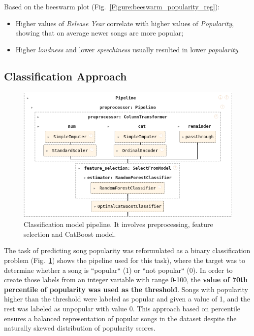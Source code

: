 Based on the beeswarm plot (Fig.~\ref{Figure:beeswarm_popularity_reg}):
\begin{itemize}
  \item Higher values of \textit{Release Year} correlate with higher values of
    \textit{Popularity}, showing that on average newer songs are more
    popular;
  \item Higher \textit{loudness} and lower \textit{speechiness}
    usually resulted in lower \textit{popularity}.
\end{itemize}



\subsection{Classification Approach}

\begin{center}
\begin{figure}[H]
  \centering
  \includegraphics[width=6in]{img/clf_pipeline.png}
  \caption{Classification model pipeline. It involves preprocessing, feature
  selection and CatBoost model.}
  \label{Figure:clf_pipeline}
\end{figure}
\end{center}

The task of predicting song popularity was reformulated as a binary
classification problem (Fig.~\ref{Figure:clf_pipeline}) shows the pipeline used
for this task), where the target was to determine whether a song is ``popular``
(1) or ``not popular`` (0). In order to create those labels from an integer
variable with range 0-100, the \textbf{value of 70th percentile of popularity
was used as the threshold}. Songs with popularity higher than the threshold
were labeled as popular and given a value of 1, and the rest was labeled as
unpopular with value 0. This approach based on percentile ensures a balanced
representation of popular songs in the dataset despite the naturally skewed
distribution of popularity scores.

